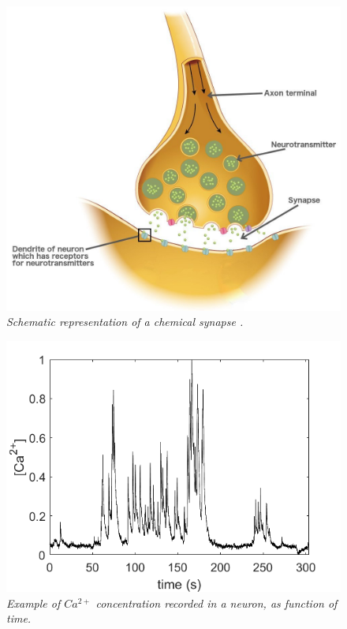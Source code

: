 \documentclass[12pt, a4paper]{report}
\begin{document}
 
 \begin{figure}[H]
 	\begin{center}
 		\includegraphics[scale=0.2]{synapse.jpg} 
 	\end{center} 
 	\caption{\textit{Schematic representation of a chemical synapse \cite{44}.}}\label{synapse}
 	
 \end{figure}

\begin{figure}[H]
	\begin{center}
		\includegraphics[scale=.50]{Ca_conc.png} 
	\end{center} 
	\caption{\textit{Example of $Ca^{2+}$ concentration recorded in a neuron, as function of time.}} \label{oscillations}
	
\end{figure}
	
\end{document}
